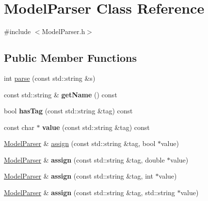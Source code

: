 \hypertarget{classModelParser}{\section{Model\-Parser Class Reference}
\label{classModelParser}
}


{\ttfamily \#include $<$Model\-Parser.\-h$>$}

\subsection*{Public Member Functions}
\begin{DoxyCompactItemize}
\item 
int \hyperlink{classModelParser_a83a5484f3fa5e80242216cb0d08180a4}{parse} (const std\-::string \&s)
\item 
\hypertarget{classModelParser_aab017724228e05e104c48b65e6591965}{const std\-::string \& {\bfseries get\-Name} () const }\label{classModelParser_aab017724228e05e104c48b65e6591965}

\item 
\hypertarget{classModelParser_a48674af5a50b124b86194864385af517}{bool {\bfseries has\-Tag} (const std\-::string \&tag) const }\label{classModelParser_a48674af5a50b124b86194864385af517}

\item 
\hypertarget{classModelParser_aaed7ae55cc66c1c4fcd38672be12d712}{const char $\ast$ {\bfseries value} (const std\-::string \&tag) const }\label{classModelParser_aaed7ae55cc66c1c4fcd38672be12d712}

\item 
\hyperlink{classModelParser}{Model\-Parser} \& \hyperlink{classModelParser_a29363d37f73bcc655c995d30d662cc08}{assign} (const std\-::string \&tag, bool $\ast$value)
\item 
\hypertarget{classModelParser_af62115ed375db3e8909932f3636d09d4}{\hyperlink{classModelParser}{Model\-Parser} \& {\bfseries assign} (const std\-::string \&tag, double $\ast$value)}\label{classModelParser_af62115ed375db3e8909932f3636d09d4}

\item 
\hypertarget{classModelParser_abd272e8dc6db873c3b6d3e2f85179124}{\hyperlink{classModelParser}{Model\-Parser} \& {\bfseries assign} (const std\-::string \&tag, int $\ast$value)}\label{classModelParser_abd272e8dc6db873c3b6d3e2f85179124}

\item 
\hypertarget{classModelParser_a26bb6bf4aee749a358ffe77ea616bd60}{\hyperlink{classModelParser}{Model\-Parser} \& {\bfseries assign} (const std\-::string \&tag, std\-::string $\ast$value)}\label{classModelParser_a26bb6bf4aee749a358ffe77ea616bd60}


\end{DoxyCompactItemize}
